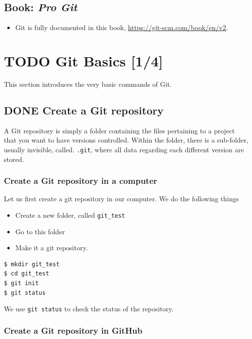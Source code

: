 \documentclass[a4paper,11pt]{article}
\begin{document}
\subsection{Book: \emph{Pro Git}}
\label{sec:org4960d6f}

\begin{itemize}
\item Git is fully documented in this book,
\url{https://git-scm.com/book/en/v2}.
\end{itemize}


\section{{\bfseries\sffamily TODO} Git Basics [1/4]}
\label{sec:org71acf4f}

This section introduces the very basic commands of Git.

\subsection{{\bfseries\sffamily DONE} Create a Git repository}
\label{sec:orgb9aef2a}
A Git repository is simply a folder containing the files pertaining to
a project that you want to have versions controlled. Within the
folder, there is a sub-folder, usually invisible, called. \texttt{.git},
where all data regarding each different version are stored.

\subsubsection*{Create a Git repository in a computer}
\label{sec:orgd2e355b}

Let us first create a git repository in our computer. We do the
following things
\begin{itemize}
\item Create a new folder, called \texttt{git\_test}
\item Go to this folder
\item Make it a git repository.
\end{itemize}

\begin{verbatim}
$ mkdir git_test
$ cd git_test
$ git init
$ git status
\end{verbatim}

We use \texttt{git status} to check the status of the repository.

\subsubsection*{Create a Git repository in GitHub}
\label{sec:org5420443}
\end{document}
